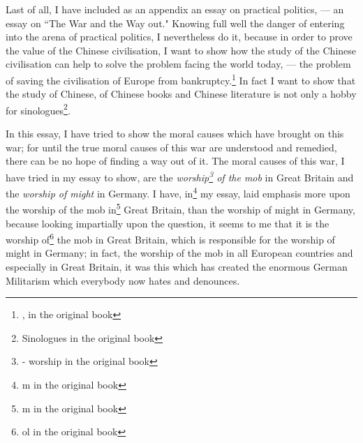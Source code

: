 Last of all, I have included as an appendix an essay on practical politics, --- an essay on ``The War and the Way out."
Knowing full well the danger of entering into the arena of practical politics, I nevertheless do it, because in order to prove the value of the Chinese civilisation, I want to show how the study of the Chinese civilisation can help to solve the problem facing the world today, --- the problem of saving the civilisation of Europe from bankruptcy.\footnote{, in the original book} 
In fact I want to show that the study of Chinese, of Chinese books and Chinese literature is not only a hobby for sinologues\footnote{Sinologues in the original book}.

In this essay, I have tried to show the moral causes which have brought on this war; for until the true moral causes of this war are understood and remedied, there can be no hope of finding a way out of it.
The moral causes of this war, I have tried in my essay to show, are the \emph{worship\footnote{- worship in the original book} of the mob} in Great Britain and the \emph{worship of might} in Germany.
I have, in\footnote{m in the original book} my essay, laid emphasis more upon the worship of the mob in\footnote{m in the original book} Great Britain, than the worship of might in Germany, because looking impartially upon the question, it seems to me that it is the worship of\footnote{ol in the original book} the mob in Great Britain, which is responsible for the worship of might in Germany; in fact, the worship of the mob in all European countries and especially in Great Britain, it was this which has created the enormous German Militarism which everybody now hates and denounces.

